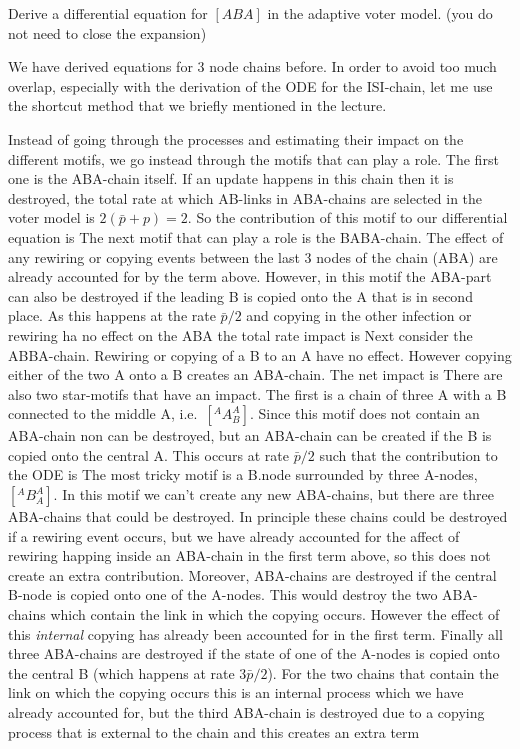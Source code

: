 Derive a differential equation for $[ABA]$ in the adaptive voter model. (you do not need to close the expansion)

\solution

We have derived equations for 3 node chains before. In order to avoid too much overlap, especially with the derivation of the ODE for the ISI-chain, let me use the shortcut method that we briefly mentioned in the lecture. 

Instead of going through the processes and estimating their impact on the different motifs, we go instead through the motifs that can play a role. The first one is the ABA-chain itself. If an update happens in this chain then it is destroyed, the total rate at which AB-links in ABA-chains are selected in the voter model is 
$2(\bar{p}+p)=2$. So the contribution of this motif to our differential equation is 
The next motif that can play a role is the BABA-chain. The effect of any rewiring or copying events between the last 3 nodes of the chain (ABA) are already accounted for by the term above. However, in this motif the ABA-part can also be destroyed if the leading B is copied onto the A that is in second place. As this happens at the rate $\bar{p}/2$ and copying in the other infection or rewiring ha no effect on the ABA the total rate impact is 
Next consider the ABBA-chain. Rewiring or copying of a B to an A have no effect. However copying either of the two A onto a B creates an ABA-chain. The net impact is 
There are also two star-motifs that have an impact. The first is a chain of three A with a B connected to the middle A, i.e.~$[^AA_B^A]$. Since this motif does not contain an ABA-chain non can be destroyed, but an ABA-chain can be created if the B is copied onto the central A. This occurs at rate $\bar{p}/2$ such that the contribution to the ODE is
The most tricky motif is a B.node surrounded by three A-nodes, $[^AB^A_A]$. In this motif we can't create any new ABA-chains, but there are three ABA-chains that could be destroyed. In principle these chains could be destroyed if a rewiring event occurs, but we have already accounted for the affect of rewiring happing inside an ABA-chain in the first term above, so this does not create an extra contribution. Moreover, ABA-chains are destroyed if the central B-node is copied onto one of the A-nodes. This would destroy the two ABA-chains which contain the link in which the copying occurs. However the effect of this \emph{internal} copying has already been accounted for in the first term. Finally all three ABA-chains are destroyed if the state of one of the A-nodes is copied onto the central B (which happens at rate $3\bar{p}/2$). For the two chains that contain the link on which the copying occurs this is an internal process which we have already accounted for, but the third ABA-chain is destroyed due to a copying process that is external to the chain and this creates an extra term
